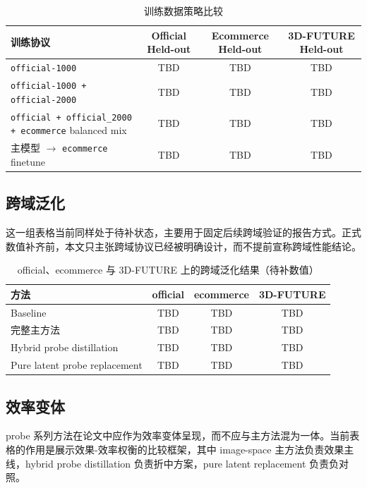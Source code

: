 \documentclass[UTF8,a4paper]{ctexart}
\begin{document}
\begin{table}[htbp]
\centering
\small
\setlength{\tabcolsep}{4pt}
\caption{训练数据策略比较}
\begin{tabular}{p{4.6cm}ccc}
\toprule
训练协议 & Official Held-out & Ecommerce Held-out & 3D-FUTURE Held-out \\
\midrule
\texttt{official-1000} & TBD & TBD & TBD \\
\texttt{official-1000 + official-2000} & TBD & TBD & TBD \\
\texttt{official + official\_2000 + ecommerce} balanced mix & TBD & TBD & TBD \\
主模型 $\rightarrow$ \texttt{ecommerce} finetune & TBD & TBD & TBD \\
\bottomrule
\end{tabular}
\end{table}

\subsection{跨域泛化}

这一组表格当前同样处于待补状态，主要用于固定后续跨域验证的报告方式。正式数值补齐前，本文只主张跨域协议已经被明确设计，而不提前宣称跨域性能结论。

\begin{table}[htbp]
\centering
\caption{official、ecommerce 与 3D-FUTURE 上的跨域泛化结果（待补数值）}
\begin{tabular}{lccc}
\toprule
方法 & official & ecommerce & 3D-FUTURE \\
\midrule
Baseline & TBD & TBD & TBD \\
完整主方法 & TBD & TBD & TBD \\
Hybrid probe distillation & TBD & TBD & TBD \\
Pure latent probe replacement & TBD & TBD & TBD \\
\bottomrule
\end{tabular}
\end{table}

\subsection{效率变体}

probe 系列方法在论文中应作为效率变体呈现，而不应与主方法混为一体。当前表格的作用是展示效果-效率权衡的比较框架，其中 image-space 主方法负责效果主线，hybrid probe distillation 负责折中方案，pure latent replacement 负责负对照。
\end{document}
